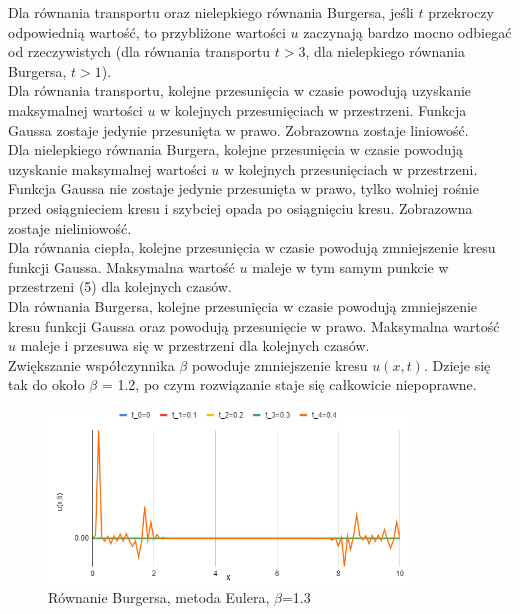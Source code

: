 \documentclass[a4paper,12pt]{article}
\begin{document}
Dla równania transportu oraz nielepkiego równania Burgersa, jeśli $t$ przekroczy odpowiednią wartość, to przybliżone wartości $u$ zaczynają bardzo mocno odbiegać od rzeczywistych (dla równania transportu $t>3$, dla nielepkiego równania Burgersa, $t>1$).\\

Dla równania transportu, kolejne przesunięcia w czasie powodują uzyskanie maksymalnej wartości $u$ w kolejnych przesunięciach w przestrzeni.  Funkcja Gaussa zostaje jedynie przesunięta w prawo.  Zobrazowna zostaje liniowość.\\

Dla nielepkiego równania Burgera, kolejne przesunięcia w czasie powodują uzyskanie maksymalnej wartości $u$ w kolejnych przesunięciach w przestrzeni. Funkcja Gaussa nie zostaje jedynie przesunięta w prawo, tylko wolniej rośnie przed osiągnieciem kresu i szybciej opada po osiągnięciu kresu. Zobrazowna zostaje nieliniowość.\\

Dla równania ciepła, kolejne przesunięcia w czasie powodują zmniejszenie kresu funkcji Gaussa. Maksymalna wartość $u$ maleje w tym samym punkcie w przestrzeni (5) dla kolejnych czasów.\\ 

Dla równania Burgersa, kolejne przesunięcia w czasie powodują zmniejszenie kresu funkcji Gaussa oraz powodują przesunięcie w prawo. Maksymalna wartość $u$ maleje i przesuwa się w przestrzeni dla kolejnych czasów.\\

Zwiększanie współczynnika $\beta$ powoduje zmniejszenie kresu $u(x,t)$. Dzieje się tak do około $\beta$ = 1.2, po czym rozwiązanie staje się całkowicie niepoprawne.\\
\begin{figure}[h]
\caption{Równanie Burgersa, metoda Eulera, $\beta$=1.3}
\centering
\includegraphics[width=0.85\textwidth]{rys/10.png}
\end{figure}
\end{document}
